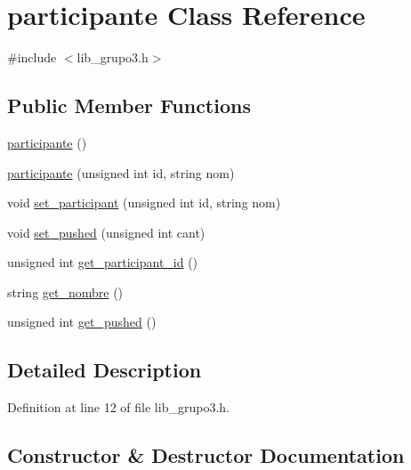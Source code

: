 \hypertarget{classparticipante}{}\section{participante Class Reference}
\label{classparticipante}


{\ttfamily \#include $<$lib\+\_\+grupo3.\+h$>$}

\subsection*{Public Member Functions}
\begin{DoxyCompactItemize}
\item 
\hyperlink{classparticipante_a23dad13159ab3128aaa5ff566d17651c}{participante} ()
\item 
\hyperlink{classparticipante_ae5622dd01c7eb4a9b5ab16416713532a}{participante} (unsigned int id, string nom)
\item 
void \hyperlink{classparticipante_aeba4c21aed4c6011b46b13732ccc25df}{set\+\_\+participant} (unsigned int id, string nom)
\item 
void \hyperlink{classparticipante_afcfca6704c1dfac469f5908b683238bc}{set\+\_\+pushed} (unsigned int cant)
\item 
unsigned int \hyperlink{classparticipante_a7bf312844c7814bcaaf6b20466a16283}{get\+\_\+participant\+\_\+id} ()
\item 
string \hyperlink{classparticipante_a00d27dd27a5bf61677c8dfc8937e1b43}{get\+\_\+nombre} ()
\item 
unsigned int \hyperlink{classparticipante_a5bd7015af88db27e170a724ff38148c9}{get\+\_\+pushed} ()
\end{DoxyCompactItemize}


\subsection{Detailed Description}


Definition at line 12 of file lib\+\_\+grupo3.\+h.



\subsection{Constructor \& Destructor Documentation}
\mbox{\label{classparticipante_a23dad13159ab3128aaa5ff566d17651c}} 
